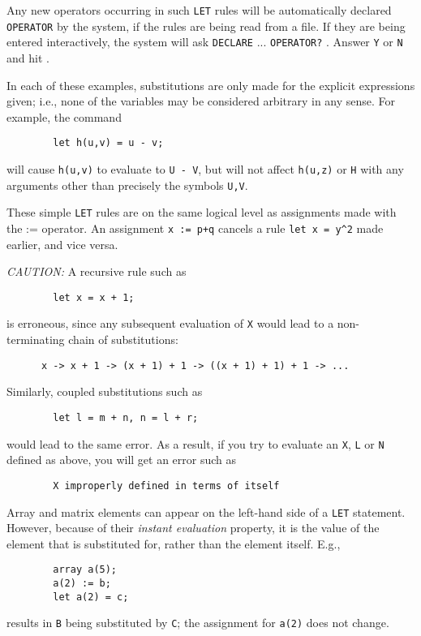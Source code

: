 Any new operators occurring in such {\tt LET} rules will be automatically
declared {\tt OPERATOR} by the system, if the rules are being read from a
file.  If they are being entered interactively, the system will ask
{\tt DECLARE} ... {\tt OPERATOR?} .  Answer {\tt Y} or {\tt N} and hit
.

In each of these examples, substitutions are only made for the explicit
expressions given; i.e., none of the variables may be considered arbitrary
in any sense. For example, the command
\begin{verbatim}
        let h(u,v) = u - v;
\end{verbatim}
will cause {\tt h(u,v)} to evaluate to {\tt U - V}, but will not affect
{\tt h(u,z)} or {\tt H} with any arguments other than precisely the
symbols {\tt U,V}.

These simple {\tt LET} rules are on the same logical level as assignments
made with the := operator.  An assignment {\tt x := p+q} cancels a rule
{\tt let x = y\verb|^|2} made earlier, and vice versa.

{\it CAUTION:} A recursive rule such as
\begin{verbatim}
        let x = x + 1;
\end{verbatim}
is erroneous, since any subsequent evaluation of {\tt X} would lead to a
non-terminating chain of substitutions:
\begin{verbatim}
      x -> x + 1 -> (x + 1) + 1 -> ((x + 1) + 1) + 1 -> ...
\end{verbatim}
Similarly, coupled substitutions such as
\begin{verbatim}
        let l = m + n, n = l + r;
\end{verbatim}
would lead to the same error. As a result, if you try to evaluate an {\tt X},
{\tt L} or {\tt N} defined as above, you will get an error such as
\begin{verbatim}
        X improperly defined in terms of itself
\end{verbatim}

Array and matrix elements can appear on the left-hand side of a {\tt LET}
statement. However, because of their {\em instant evaluation\/}
 property, it is the value of the element that
is substituted for, rather than the element itself.  E.g.,
\begin{verbatim}
        array a(5);
        a(2) := b;
        let a(2) = c;
\end{verbatim}
results in {\tt B} being substituted by {\tt C}; the assignment for
{\tt a(2)} does not change.

